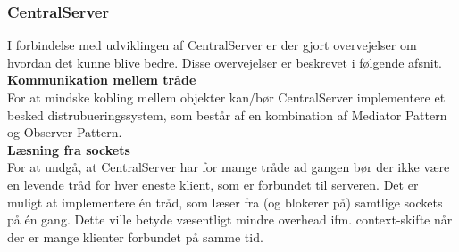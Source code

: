 \subsubsection{CentralServer}
I forbindelse med udviklingen af CentralServer er der gjort overvejelser om hvordan det kunne blive bedre. Disse overvejelser er beskrevet i følgende afsnit.\\

\textbf{Kommunikation mellem tråde}\\
For at mindske kobling mellem objekter kan/bør CentralServer implementere et besked distrubueringssystem, som består af en kombination af Mediator Pattern og Observer Pattern.\\

\textbf{Læsning fra sockets}\\
For at undgå, at CentralServer har for mange tråde ad gangen bør der ikke være en levende tråd for hver eneste klient, som er forbundet til serveren. Det er muligt at implementere én tråd, som læser fra (og blokerer på) samtlige sockets på én gang. Dette ville betyde væsentligt mindre overhead ifm. context-skifte når der er mange klienter forbundet på samme tid.